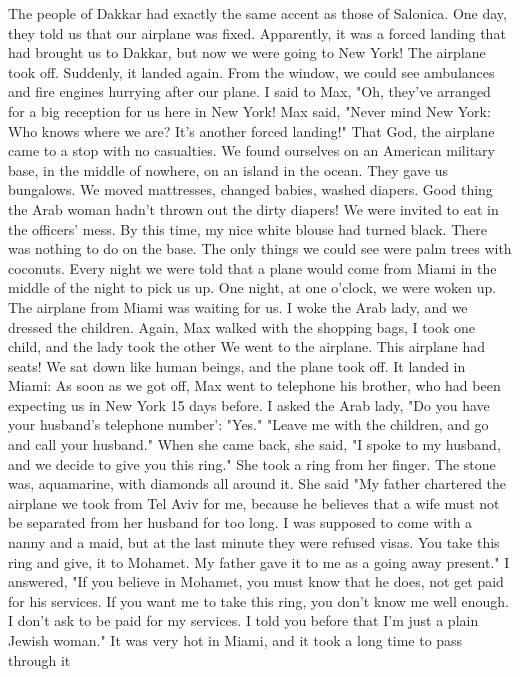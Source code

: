 The people of Dakkar had 
exactly the same accent as those of Salonica.
One day, they told us that 
our airplane was fixed.
Apparently, it was a forced landing that had 
brought us to Dakkar, but now we were going to New York!
The airplane took off.
Suddenly, it landed again.
From the window, we could see ambulances and fire engines hurrying after our plane.
I 
said to Max, "Oh, they've arranged for a big reception for us here in 
New York!
Max said, "Never mind New York: Who knows where we are?
It's another 
forced landing!"
That God, the airplane came to a stop with no 
casualties.
We found ourselves on an American military base, in the middle of nowhere, on an island in the ocean.
They gave us bungalows.
We 
moved mattresses, changed babies, washed diapers.
Good thing the Arab 
woman hadn't thrown out the dirty diapers!
We were invited to eat in the 
officers' mess.
By this time, my nice white blouse had turned black.
There was nothing to do on the base.
The only things we could see were 
palm trees with coconuts.
Every night we were told that a plane would 
come from Miami in the middle of the night to pick us up.
One night, at 
one o'clock, we were woken up.
The airplane from Miami was waiting for 
us.
I woke the Arab lady, and we dressed the children.
Again, Max walked with the shopping bags, I took one child, and the lady took the other 
We went to the airplane.
This airplane had seats!
We sat down like human beings, and the
plane took off.
It landed in Miami: As soon as we got off, Max went to 
telephone his brother, who had been expecting us in New York 15 days before.
I asked the Arab lady, "Do you have your husband's telephone number': 
"Yes."
"Leave me with the children, and go and call your husband."
When she came back, she said, "I spoke to my husband, and we decide 
to give you this ring."
She took a ring from her finger.
The stone was, 
aquamarine, with diamonds all around it.
She said "My father chartered the airplane we took from Tel Aviv for 
me, because he believes that a wife must not be separated from her husband 
for too long.
I was supposed to come with a nanny and a maid, but 
at the last minute they were refused visas.
You take this ring and give, 
it to Mohamet.
My father gave it to me as a going away present."
I answered, "If you believe in Mohamet, you must know that he does, 
not get paid for his services.
If you want me to take this ring, you 
don't know me well enough.
I don't ask to be paid for my services.
I 
told you before that I'm just a plain Jewish woman."
It was very hot in Miami, and it took a long time to pass through it 
